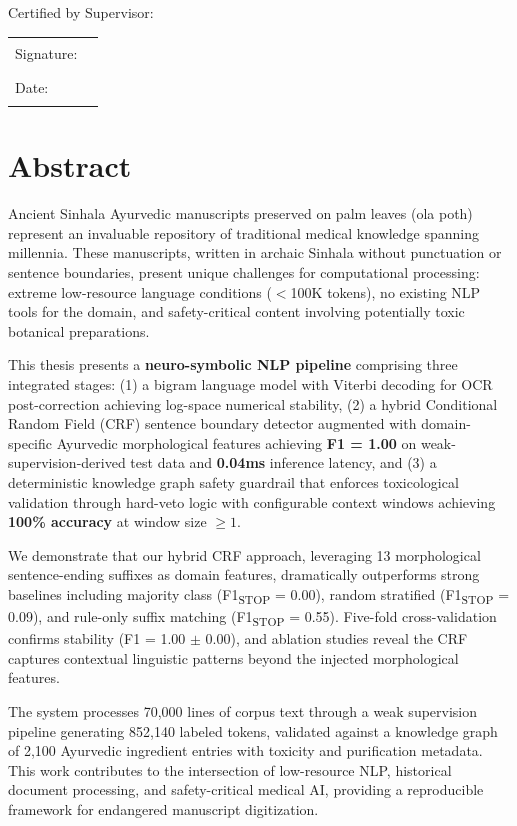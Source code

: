 \documentclass[12pt, a4paper, twoside]{report}
\begin{document}
\noindent Certified by Supervisor:

\noindent
\begin{tabular}{ll}
Signature: & \rule{6cm}{0.4pt} \\[1cm]
Date: & \rule{6cm}{0.4pt}
\end{tabular}

\chapter*{Abstract}

Ancient Sinhala Ayurvedic manuscripts preserved on palm leaves (ola poth) represent an invaluable repository of traditional medical knowledge spanning millennia. These manuscripts, written in archaic Sinhala without punctuation or sentence boundaries, present unique challenges for computational processing: extreme low-resource language conditions ($<$100K tokens), no existing NLP tools for the domain, and safety-critical content involving potentially toxic botanical preparations.

This thesis presents a \textbf{neuro-symbolic NLP pipeline} comprising three integrated stages: (1) a bigram language model with Viterbi decoding for OCR post-correction achieving log-space numerical stability, (2) a hybrid Conditional Random Field (CRF) sentence boundary detector augmented with domain-specific Ayurvedic morphological features achieving \textbf{F1 = 1.00} on weak-supervision-derived test data and \textbf{0.04ms} inference latency, and (3) a deterministic knowledge graph safety guardrail that enforces toxicological validation through hard-veto logic with configurable context windows achieving \textbf{100\% accuracy} at window size $\geq 1$.

We demonstrate that our hybrid CRF approach, leveraging 13 morphological sentence-ending suffixes as domain features, dramatically outperforms strong baselines including majority class (F1\textsubscript{STOP} = 0.00), random stratified (F1\textsubscript{STOP} = 0.09), and rule-only suffix matching (F1\textsubscript{STOP} = 0.55). Five-fold cross-validation confirms stability (F1 = 1.00 $\pm$ 0.00), and ablation studies reveal the CRF captures contextual linguistic patterns beyond the injected morphological features.

The system processes 70,000 lines of corpus text through a weak supervision pipeline generating 852,140 labeled tokens, validated against a knowledge graph of 2,100 Ayurvedic ingredient entries with toxicity and purification metadata. This work contributes to the intersection of low-resource NLP, historical document processing, and safety-critical medical AI, providing a reproducible framework for endangered manuscript digitization.
\end{document}
